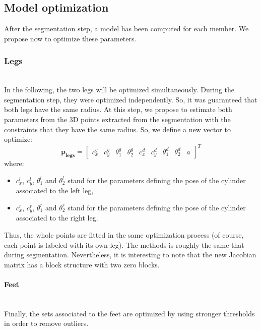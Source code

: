 \documentclass[letterpaper, 10 pt, conference]{ieeeconf}
\begin{document}
\subsection{Model optimization}
After the segmentation step, a model has been computed for each member. We propose now to optimize these parameters.

\subsubsection{Legs}~\\
In the following, the two legs will be {optimized simultaneously}. During the segmentation step, they were optimized independently. So, it was guaranteed that both legs have the same radius. At this step, we propose to estimate both parameters from the 3D points extracted from the segmentation with the constraints that they have the same radius. So, we define a new vector to optimize:
\begin{equation}
	\mathbf{p_{legs}} = 
	\begin{bmatrix}
		c_x^g & c_y^g & \theta_1^g & \theta_2^g & c_x^d & c_y^d & \theta_1^d & \theta_2^d & a
	\end{bmatrix}^T
\end{equation}
where:
\begin{itemize}
	\item $c_x^l$, $c_y^l$, $\theta_1^l$ and $\theta_2^l$ stand for the parameters defining the pose of the cylinder associated to the left leg,
	\item $c_x^r$, $c_y^r$, $\theta_1^r$ and $\theta_2^r$ stand for the parameters defining the pose of the cylinder associated to the right leg.
\end{itemize}
Thus, the whole points are fitted in the same optimization process (of course, each point is labeled with its own leg). The methods is roughly the same that during segmentation. Nevertheless, it is interesting to note that the new Jacobian matrix has a block structure with two zero blocks.

\paragraph{Feet}~\\
Finally, the sets associated to the feet are optimized by using stronger thresholds in order to remove outliers.
\end{document}
